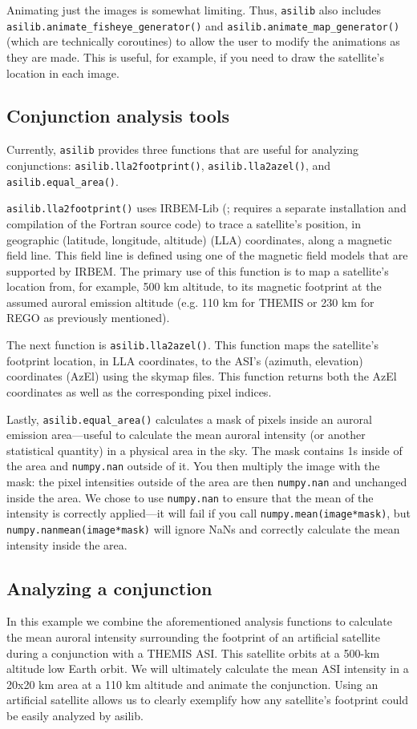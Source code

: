 \documentclass[utf8]{FrontiersinHarvard} %
\begin{document}
Animating just the images is somewhat limiting. Thus, \verb|asilib| also includes \\ \verb|asilib.animate_fisheye_generator()| and \verb|asilib.animate_map_generator()| (which are technically coroutines) to allow the user to modify the animations as they are made. This is useful, for example, if you need to draw the satellite's location in each image.

\subsection{Conjunction analysis tools}
Currently, \verb|asilib| provides three functions that are useful for analyzing conjunctions: \verb|asilib.lla2footprint()|, \verb|asilib.lla2azel()|, and \verb|asilib.equal_area()|.

\verb|asilib.lla2footprint()| uses IRBEM-Lib (\citet{irbem}; requires a separate installation and compilation of the Fortran source code) to trace a satellite's position, in geographic (latitude, longitude, altitude) (LLA) coordinates, along a magnetic field line. This field line is defined using one of the magnetic field models that are supported by IRBEM. The primary use of this function is to map a satellite's location from, for example, 500 km altitude, to its magnetic footprint at the assumed auroral emission altitude (e.g. 110 km for THEMIS or 230 km for REGO as previously mentioned).

The next function is \verb|asilib.lla2azel()|. This function maps the satellite's footprint location, in LLA coordinates, to the ASI's (azimuth, elevation) coordinates (AzEl) using the skymap files. This function returns both the AzEl coordinates as well as the corresponding pixel indices.

Lastly, \verb|asilib.equal_area()| calculates a mask of pixels inside an auroral emission area---useful to calculate the mean auroral intensity (or another statistical quantity) in a physical area in the sky. The mask contains 1s inside of the area and \verb|numpy.nan| outside of it. You then multiply the image with the mask: the pixel intensities outside of the area are then \verb|numpy.nan| and unchanged inside the area. We chose to use \verb|numpy.nan| to ensure that the mean of the intensity is correctly applied---it will fail if you call \verb|numpy.mean(image*mask)|, but \verb|numpy.nanmean(image*mask)| will ignore NaNs and correctly calculate the mean intensity inside the area.

\subsection{Analyzing a conjunction}\label{satellite_conjunction}
In this example we combine the aforementioned analysis functions to calculate the mean auroral intensity surrounding the footprint of an artificial satellite during a conjunction with a THEMIS ASI. This satellite orbits at a 500-km altitude low Earth orbit. We will ultimately calculate the mean ASI intensity in a 20x20 km area at a 110 km altitude and animate the conjunction. Using an artificial satellite allows us to clearly exemplify how any satellite's footprint could be easily analyzed by asilib. 
\end{document}
